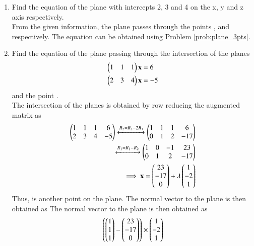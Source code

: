 \begin{enumerate}[label=\arabic*.,ref=\thesubsection.\theenumi]
\item Find the equation of the plane with intercepts 2, 3 and 4 on the x, y and z axis respectively.
\\
\solution From the given information, the plane passes through the points ,  and  respectively. The equation can be obtained using Problem \ref{prob:plane_3pts}.

\item Find the equation of the plane passing through the intersection of the planes 
%
\begin{align}
\label{eq:plane_2p_1pt_1}
\begin{pmatrix}1 & 1 & 1\end{pmatrix}\mathbf{x}&=6  
\\
\begin{pmatrix}2 & 3 & 4\end{pmatrix}\mathbf{x}&=-5
\label{eq:plane_2p_1pt_2}
\end{align}
%
and the point .
\\
\solution The intersection of the planes is obtained by row reducing the augmented matrix as
%
\begin{align}
\begin{pmatrix}
1 & 1 & 1 & 6
\\
2 & 3 & 4 & -5
\end{pmatrix}
\xleftrightarrow[]{R_2 = R_2 -2R_1}
\begin{pmatrix}
1 & 1 & 1 & 6
\\
0 & 1 & 2 & -17
\end{pmatrix}
\\
\xleftrightarrow[]{R_1 = R_1 -R_2}
\begin{pmatrix}
1 & 0 & -1 & 23
\\
0 & 1 & 2 & -17
\end{pmatrix}
\\
\implies 
\mathbf{x} = \begin{pmatrix}23\\-17\\0\end{pmatrix}+\lambda\begin{pmatrix}1\\-2\\1\end{pmatrix}
\end{align}
%
Thus,  is another point on the plane.  The normal vector to the plane is then obtained as
The normal vector to the plane is then obtained as
%
\begin{align}
\brak{ \myvec{1\\1\\1}-\myvec{23\\-17\\0}}\times \myvec{1\\-2\\1} 

\end{align}
\end{enumerate}
